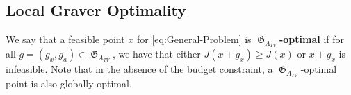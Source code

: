 \documentclass[pdflatex,sn-mathphys-num]{sn-jnl}%
\DeclareMathOperator{\Ecal}{\mathcal{E}}
\DeclareMathOperator{\Vcal}{\mathcal{V}}
\DeclareMathOperator{\Gfrak}{\mathfrak{G}}
\begin{document}





\subsection{Local Graver Optimality}

We say that a feasible point $x$ for \eqref{eq:General-Problem} is $\Gfrak_{A_{TV}}$\textbf{-optimal} if for all $g = (g_x, g_a) \in \Gfrak_{A_{TV}}$, we have that either $J(x + g_x) \ge J(x)$ or $x + g_x$ is infeasible. Note that in the absence of the budget constraint, a $\Gfrak_{A_{TV}}$-optimal point is also globally optimal.
\end{document}
